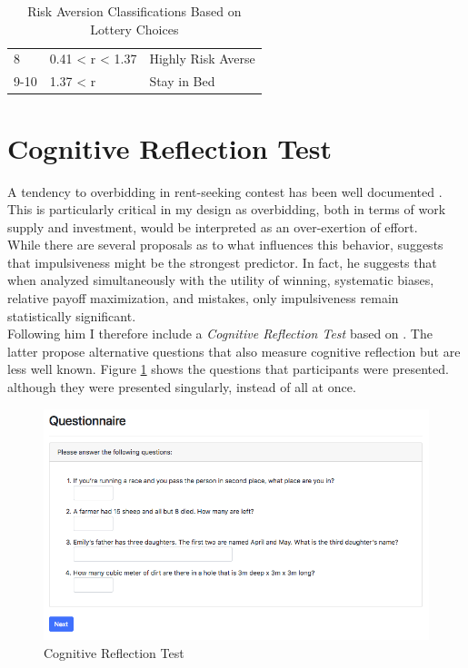 \begin{table}[]
\begin{tabular}{lll}
    8                                                                 & 0.41 < r < 1.37                                                           & Highly Risk Averse                                                        \\
    9-10                                                              & 1.37 < r                                                                  & Stay in Bed\\
    \hline
    \end{tabular}
    \caption{Risk Aversion Classifications Based on Lottery Choices\\ \citep{holt2002}}
    \label{table:HL}
    \end{table}
    
    \section{Cognitive Reflection Test}
    
    A tendency to overbidding in rent-seeking contest has been well documented \citep{sheremeta2013, dechenaux2015}. This is particularly critical in my design as overbidding, both in terms of work supply and investment, would be interpreted as an over-exertion of effort.\\
     
    While there are several proposals as to what influences this behavior, \cite{sheremeta2016} suggests that impulsiveness might be the strongest predictor. In fact, he suggests that when analyzed simultaneously with the utility of winning, systematic biases, relative payoff maximization, and mistakes, only impulsiveness remain statistically significant.\\
    
    Following him I therefore include a \textit{Cognitive Reflection Test} based on \cite{thomson2016}. The latter propose alternative questions that also measure cognitive reflection but are less well known. Figure \ref{fig:crt_quest} shows the questions that participants were presented. although they were presented singularly, instead of all at once.
    
    \begin{figure}
        \centering
        \includegraphics[width=\textwidth]{graphs/CRT_Quest.png}
        \caption{Cognitive Reflection Test \citep{thomson2016}}
        \label{fig:crt_quest}
    \end{figure}
    
